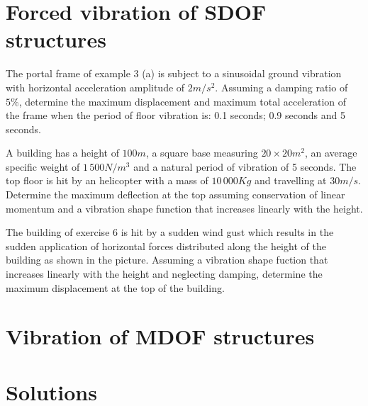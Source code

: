 \documentclass{problems}
\begin{document}
\begin{center}
\end{center}



\section{Forced vibration of SDOF structures}


 The portal frame of example 3 (a) is subject to a sinusoidal ground vibration with horizontal acceleration amplitude of $2m/s^2$. Assuming a damping ratio of $5\%$, determine the maximum displacement and maximum total acceleration of the frame when the period of floor vibration is: 0.1 seconds; 0.9 seconds and 5 seconds.

\begin{center}
\end{center}

 A building has a height of $100m$, a square base measuring $20\times20m^2$, an average specific weight of $1\,500N/m^3$ and a natural period of vibration of 5 seconds. The top floor is hit by an helicopter with a mass of $10\,000Kg$ and travelling at $30m/s$. Determine the maximum deflection at the top assuming conservation of linear momentum and a vibration shape function that increases linearly with the height.

\begin{center}
\end{center}


 The building of exercise 6 is hit by a sudden wind gust which results in the sudden application of horizontal forces distributed along the height of the building as shown in the picture. Assuming a vibration shape fuction that increases linearly with the height and neglecting damping, determine the maximum displacement at the top of the building.



\section{Vibration of MDOF structures}


\section{Solutions}


\end{document}
